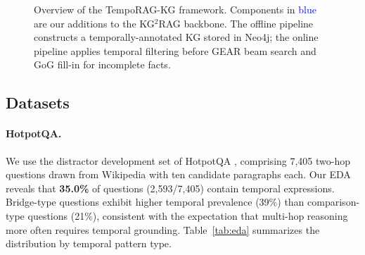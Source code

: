 \documentclass[11pt]{article}
\begin{document}
\begin{figure}[t]
  \centering
  \caption{Overview of the TempoRAG-KG framework. Components in
  \textcolor{blue}{blue} are our additions to the KG$^2$RAG backbone.
  The offline pipeline constructs a temporally-annotated KG stored in
  Neo4j; the online pipeline applies temporal filtering before GEAR
  beam search and GoG fill-in for incomplete facts.}
  \label{fig:architecture}
\end{figure}

\subsection{Datasets}

\paragraph{HotpotQA.}
We use the distractor development set of HotpotQA \cite{yang2018hotpotqa},
comprising 7,405 two-hop questions drawn from Wikipedia with ten candidate
paragraphs each. Our EDA reveals that \textbf{35.0\%} of questions
(2,593/7,405) contain temporal expressions. Bridge-type questions exhibit
higher temporal prevalence (39\%) than comparison-type questions (21\%),
consistent with the expectation that multi-hop reasoning more often
requires temporal grounding. Table~\ref{tab:eda} summarizes the
distribution by temporal pattern type.
\end{document}

